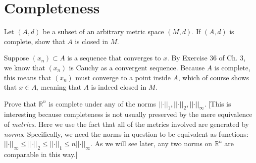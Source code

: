 \section{Completeness}

\begin{exercise}{12}
    Let $(A, d)$ be a subset of an arbitrary metric space \((M, d)\).
    If \((A, d)\) is complete, show that \(A\) is closed in \(M\).
\end{exercise}

\begin{solution}
    
    Suppose $(x_n) \subset A$ is a sequence that converges to $x$.
    By Exercise 36 of Ch. 3, we know that $(x_n)$ is Cauchy as a convergent sequence.
    Because $A$ is complete, this means that $(x_n)$ must converge to a point inside $A$, which of course shows that $x \in A$, meaning that $A$ is indeed closed in $M$.
\end{solution}

\begin{exercise}{16}
    Prove that $\mathbb{R}^n$ is complete under any of the norms $\lvert \lvert \cdot \rvert \rvert_1, \lvert \lvert \cdot \rvert \rvert_2, \lvert \lvert \cdot \rvert \rvert_{\infty}$.
    [This is interesting because completeness is not usually preserved by the mere equivalence of \textit{metrics}.
    Here we use the fact that all of the metrics involved are generated by \textit{norms}.
    Specifically, we need the norms in question to be equivalent as functions: $\lvert \lvert \cdot \rvert \rvert_{\infty} \leq \lvert \lvert \cdot \rvert \rvert_2 \leq \lvert \lvert \cdot \rvert \rvert_1 \leq n \lvert \lvert \cdot \rvert \rvert_{\infty}$.
    As we will see later, any two norms on $\mathbb{R}^n$ are comparable in this way.]
\end{exercise}

